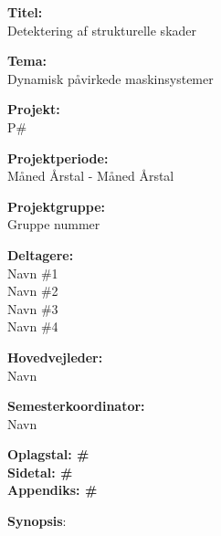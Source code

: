 \begin{minipage}[t]{0.48\textwidth}
\textbf{Titel:} \\[5pt]\bigskip\hspace{1ex}
Detektering af strukturelle skader 

\textbf{Tema:} \\[5pt]\bigskip\hspace{1ex}
Dynamisk påvirkede maskinsystemer

\textbf{Projekt:} \\[5pt]\bigskip\hspace{1ex}
P\#

\textbf{Projektperiode:} \\[5pt]\bigskip\hspace{1ex}
Måned Årstal - Måned Årstal

\textbf{Projektgruppe:} \\[5pt]\bigskip\hspace{1ex}
Gruppe nummer	

\textbf{Deltagere:} \\[5pt]\hspace*{2ex}
Navn \#1 \\\hspace*{2ex}
Navn \#2 \\\hspace*{2ex}
Navn \#3 \\\hspace*{2ex}
Navn \#4 \\\hspace*{2ex}

\textbf{Hovedvejleder:} \\[5pt]\hspace*{2ex}
Navn\\\bigskip\hspace{2ex}

\textbf{Semesterkoordinator:} \\[5pt]\hspace*{2ex}
 Navn\\\bigskip\hspace{2ex}

\vspace*{1cm}

\textbf{Oplagstal: \#}\\
\textbf{Sidetal: \#}  \\
\textbf{Appendiks: \#}

\end{minipage}
\hfill
\begin{minipage}[t]{0.483\textwidth}
\textbf{Synopsis}: \\[4pt]
\fbox{\parbox{7cm}{\bigskip\bigskip}}
\end{minipage}

\vfill


